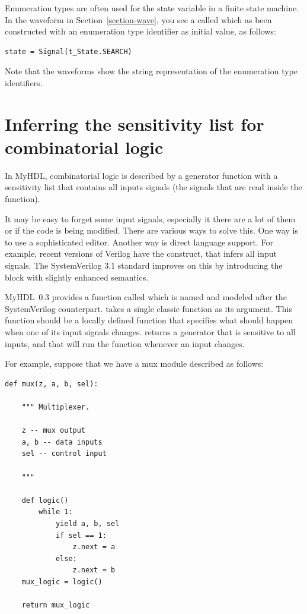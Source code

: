 \documentclass{howto}
\newcommand{\myhdl}{\protect \mbox{MyHDL}}
\begin{document}
Enumeration types are often used for the state variable in a finite
state machine.  In the waveform in Section~\ref{section-wave}, you see
a  called  which as been constructed with an
enumeration type identifier as initial value, as follows:

\begin{verbatim}
state = Signal(t_State.SEARCH)
\end{verbatim}

Note that the waveforms show the string representation of the
enumeration type identifiers. 


\section{Inferring the sensitivity list for combinatorial
logic\label{section-combinatorial}}

In \myhdl{}, combinatorial logic is described by a generator function with
a sensitivity list that contains all inputs signals (the signals that
are read inside the function).

It may be easy to forget some input signals, especially it there are a
lot of them or if the code is being modified. There are various ways
to solve this. One way is to use a sophisticated editor. Another way
is direct language support. For example, recent versions of Verilog
have the  construct, that infers all input
signals. The SystemVerilog 3.1 standard improves on this by
introducing the  block with slightly enhanced
semantics.

\myhdl\ 0.3 provides a function called  which
is named and modeled after the SystemVerilog counterpart.
 takes a single classic function as its
argument. This function should be a locally defined function that
specifies what should happen when one of its input signals
changes.  returns a generator that is
sensitive to all inputs, and that will run the function whenever an
input changes.

For example, suppose that we have a mux module described as follows:

\begin{verbatim}
def mux(z, a, b, sel):

    """ Multiplexer.
    
    z -- mux output
    a, b -- data inputs
    sel -- control input

    """

    def logic()
        while 1:
            yield a, b, sel
            if sel == 1:
                z.next = a
            else:
                z.next = b
    mux_logic = logic()

    return mux_logic
\end{verbatim}
\end{document}
